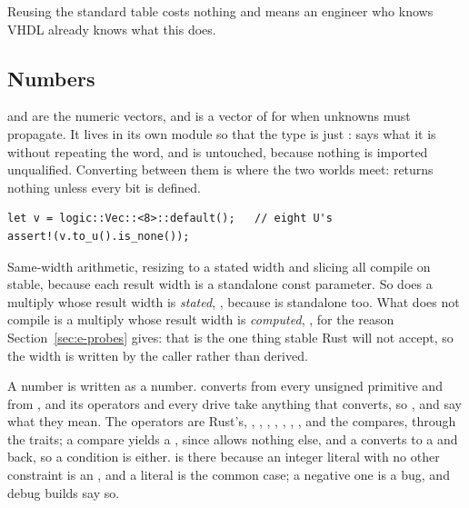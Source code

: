 Reusing the standard table costs nothing and means an engineer who knows
VHDL already knows what this does.

\subsection{Numbers}

 and  are the numeric vectors, and
 is a vector of  for when unknowns must
propagate. It lives in its own module so that the type is just
:  says what it is without repeating the
word, and  is untouched, because nothing is imported
unqualified. Converting between them is where the two worlds meet:
 returns nothing unless every bit is defined.

\begin{lstlisting}[caption={An undriven vector is unknown, and says so.},label={lst:undriven}]
let v = logic::Vec::<8>::default();   // eight U's
assert!(v.to_u().is_none());
\end{lstlisting}

Same-width arithmetic, resizing to a stated width and slicing all compile
on stable, because each result width is a standalone const parameter. So
does a multiply whose result width is \emph{stated}, ,
because  is standalone too. What does not compile is a multiply
whose result width is \emph{computed}, , for the
reason Section~\ref{sec:e-probes} gives: that is the one thing stable
Rust will not accept, so the width is written by the caller rather than
derived.

A number is written as a number.  converts from every unsigned
primitive and from , and its operators and every drive take
anything that converts, so ,  and
 say what they mean. The operators are Rust's,
\code{+}, \code{-}, \code{\&}, \code{|}, \code{\^{}}, \code{!},
\code{<<}, \code{>>} and the compares, through the 
traits; a compare yields a , since  allows
nothing else, and a  converts to a  and back, so
a condition is either.  is there because an
integer literal with no other constraint is an , and a literal
is the common case; a negative one is a bug, and debug builds say so.
